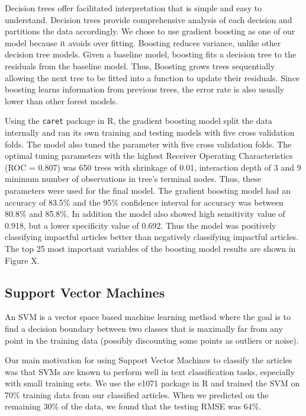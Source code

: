 \documentclass[10pt,letterpaper]{article}
\begin{document}
Decision trees offer facilitated interpretation that is simple and easy
to understand. Decision trees provide comprehensive analysis of each
decision and partitions the data accordingly. We chose to use gradient
boosting as one of our model because it avoids over fitting. Boosting
reduces variance, unlike other decision tree models. Given a baseline
model, boosting fits a decision tree to the residuals from the baseline
model. Thus, Boosting grows trees sequentially allowing the next tree to
be fitted into a function to update their residuals. Since boosting
learns information from previous trees, the error rate is also usually
lower than other forest models.

Using the \texttt{caret} package in R, the gradient boosting model split
the data internally and ran its own training and testing models with
five cross validation folds. The model also tuned the parameter with
five cross validation folds. The optimal tuning parameters with the
highest Receiver Operating Characteristics (ROC = 0.807) was 650 trees
with shrinkage of 0.01, interaction depth of 3 and 9 minimum number of
observations in tree's terminal nodes. Thus, these parameters were used
for the final model. The gradient boosting model had an accuracy of
83.5\% and the 95\% confidence interval for accuracy was between 80.8\%
and 85.8\%. In addition the model also showed high sensitivity value of
0.918, but a lower specificity value of 0.692. Thus the model was
positively classifying impactful articles better than negatively
classifying impactful articles. The top 25 most important variables of
the boosting model results are shown in Figure X.

\subsection{Support Vector Machines}\label{support-vector-machines}

An SVM is a vector space based machine learning method where the goal is
to find a decision boundary between two classes that is maximally far
from any point in the training data (possibly discounting some points as
outliers or noise).

Our main motivation for using Support Vector Machines to classify the
articles was that SVMs are known to perform well in text classification
tasks, especially with small training sets. We use the e1071 package in
R and trained the SVM on 70\% training data from our classified
articles. When we predicted on the remaining 30\% of the data, we found
that the testing RMSE was 64\%.
\end{document}

